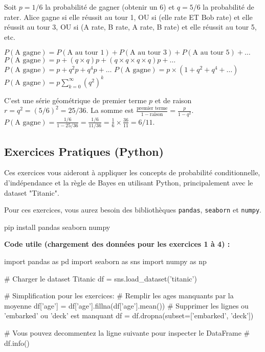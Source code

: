 \begin{correctionbox}
Soit $p=1/6$ la probabilité de gagner (obtenir un 6) et $q=5/6$ la probabilité de rater.
Alice gagne si elle réussit au tour 1, OU si (elle rate ET Bob rate) et elle réussit au tour 3, OU si (A rate, B rate, A rate, B rate) et elle réussit au tour 5, etc.

$P(\text{A gagne}) = P(\text{A au tour 1}) + P(\text{A au tour 3}) + P(\text{A au tour 5}) + \dots$
$P(\text{A gagne}) = p + (q \times q)p + (q \times q \times q \times q)p + \dots$
$P(\text{A gagne}) = p + q^2 p + q^4 p + \dots$
$P(\text{A gagne}) = p \times (1 + q^2 + q^4 + \dots)$
$P(\text{A gagne}) = p \sum_{k=0}^{\infty} (q^2)^k$

C'est une série géométrique de premier terme $p$ et de raison $r = q^2 = (5/6)^2 = 25/36$.
La somme est $\frac{\text{premier terme}}{1 - \text{raison}} = \frac{p}{1 - q^2}$.
$P(\text{A gagne}) = \frac{1/6}{1 - 25/36} = \frac{1/6}{11/36} = \frac{1}{6} \times \frac{36}{11} = 6/11$.
\end{correctionbox}

\subsection{Exercices Pratiques (Python)}

Ces exercices vous aideront à appliquer les concepts de probabilité conditionnelle, d'indépendance et la règle de Bayes en utilisant Python, principalement avec le dataset "Titanic".

Pour ces exercices, vous aurez besoin des bibliothèques \texttt{pandas}, \texttt{seaborn} et \texttt{numpy}.

\begin{codecell}
pip install pandas seaborn numpy
\end{codecell}

\textbf{Code utile (chargement des données pour les exercices 1 à 4) :}
\begin{codecell}
import pandas as pd
import seaborn as sns
import numpy as np

# Charger le dataset Titanic
df = sns.load_dataset('titanic')

# Simplification pour les exercices:
# Remplir les ages manquants par la moyenne
df['age'] = df['age'].fillna(df['age'].mean())
# Supprimer les lignes ou 'embarked' ou 'deck' est manquant
df = df.dropna(subset=['embarked', 'deck'])

# Vous pouvez decommentez la ligne suivante pour inspecter le DataFrame
# df.info()
\end{codecell}



